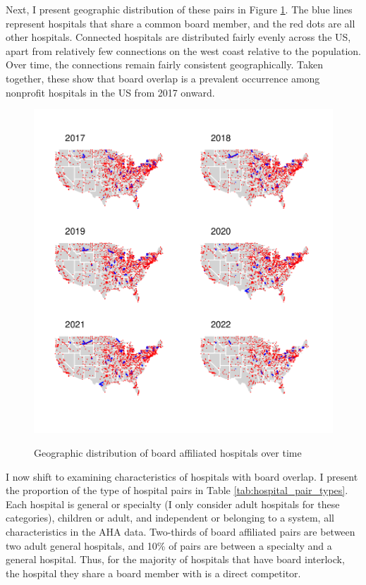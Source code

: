 \documentclass[12pt]{article}
\begin{document}
    Next, I present geographic distribution of these pairs in Figure \ref{fig:connected_maps}. The blue lines represent hospitals that share a common board member, and the red dots are all other hospitals. Connected hospitals are distributed fairly evenly across the US, apart from relatively few connections on the west coast relative to the population. Over time, the connections remain fairly consistent geographically. Taken together, these show that board overlap is a prevalent occurrence among nonprofit hospitals in the US from 2017 onward. 

    \begin{figure}[ht!]
        \centering
        \caption{Geographic distribution of board affiliated hospitals over time}
        \includegraphics[width=\textwidth]{Objects/connected_maps.pdf}
        \label{fig:connected_maps}
    \end{figure}



    I now shift to examining characteristics of hospitals with board overlap. I present the proportion of the type of hospital pairs in Table \ref{tab:hospital_pair_types}. Each hospital is general or specialty (I only consider adult hospitals for these categories), children or adult, and independent or belonging to a system, all characteristics in the AHA data. Two-thirds of board affiliated pairs are between two adult general hospitals, and 10\% of pairs are between a specialty and a general hospital. Thus, for the majority of hospitals that have board interlock, the hospital they share a board member with is a direct competitor. 
\end{document}
